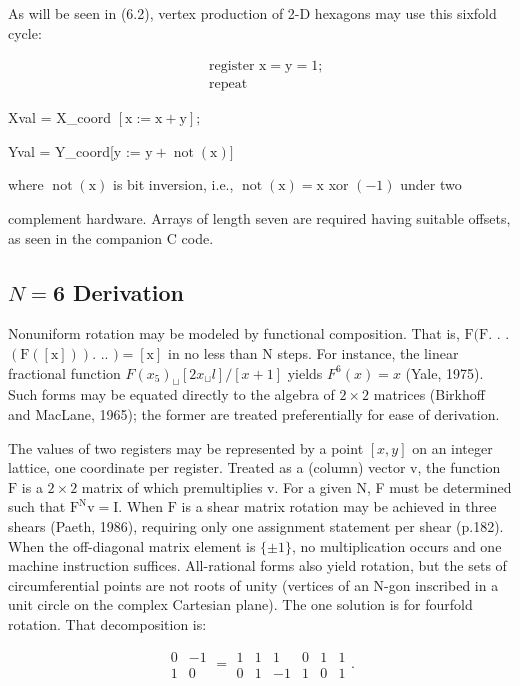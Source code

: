 \begin{CJK}{UTF8}{gbsn}
As will be seen in (6.2), vertex production of 2-D hexagons may use this sixfold cycle:

$$
\begin{aligned}
&\text { register } \mathrm{x}=\mathrm{y}=1 \text {; } \\
&\text { repeat }
\end{aligned}
$$

Xval = X\_coord $[\mathrm{x}:=\mathrm{x}+\mathrm{y}] ;$

Yval = Y\_coord[y := $\mathrm{y}+\operatorname{not}(\mathrm{x})]$

where $\operatorname{not}(\mathrm{x})$ is bit inversion, i.e., $\operatorname{not}(\mathrm{x})=\mathrm{x}$ xor $(-1)$ under two

complement hardware. Arrays of length seven are required having suitable offsets, as seen in the companion C code.

\subsection*{$N=\mathbf{6}$ Derivation}
Nonuniform rotation may be modeled by functional composition. That is, $\mathrm{F}(\mathrm{F}$. . . $(\mathrm{F}([\mathrm{x}]))$. .. $)=[\mathrm{x}]$ in no less than $\mathrm{N}$ steps. For instance, the linear fractional function $F\left(x_{5}\right)_{\sqcup}\left[2 x_{\sqcup} l\right] /[x+1]$ yields $F^{6}(x)=x$ (Yale, 1975). Such forms may be equated directly to the algebra of $2 \times 2$ matrices (Birkhoff and MacLane, 1965); the former are treated preferentially for ease of derivation.

The values of two registers may be represented by a point $[x, y]$ on an integer lattice, one coordinate per register. Treated as a (column) vector $\mathrm{v}$, the function $\mathrm{F}$ is a $2 \times 2$ matrix of which premultiplies $\mathrm{v}$. For a given $\mathrm{N}$, F must be determined such that $\mathrm{F}^{\mathrm{N}} \mathrm{v}=\mathrm{I}$. When $\mathrm{F}$ is a shear matrix rotation may be achieved in three shears (Paeth, 1986), requiring only one assignment statement per shear (p.182). When the off-diagonal matrix element is $\{\pm 1\}$, no multiplication occurs and one machine instruction suffices. All-rational forms also yield rotation, but the sets of circumferential points are not roots of unity (vertices of an $\mathrm{N}$-gon inscribed in a unit circle on the complex Cartesian plane). The one solution is for fourfold rotation. That decomposition is:

$$
\begin{array}{cc}
0 & -1 \\
1 & 0
\end{array}=\begin{array}{cccccc}
1 & 1 & 1 & 0 & 1 & 1 \\
0 & 1 & -1 & 1 & 0 & 1
\end{array} .
$$


\end{CJK}
